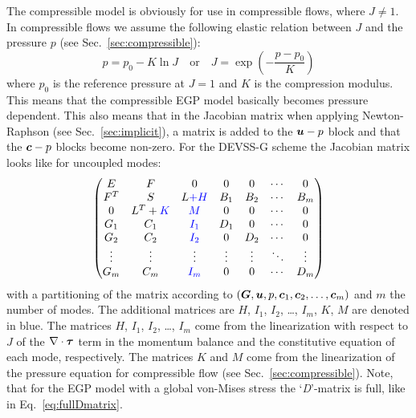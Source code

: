 The compressible model is obviously for use in compressible flows, where $J\neq 1$. In compressible flows we assume the following elastic relation between $J$ and the pressure $p$ (see Sec.~\ref{sec:compressible}):
\[
   p = p_0 - K\ln J\quad\text{or}\quad J=\exp(-\frac{p-p_0}{K}) 
\]
where $p_0$ is the reference pressure at $J=1$ and $K$ is the compression modulus. This means that the compressible EGP model basically becomes pressure dependent. This also means that in the Jacobian matrix when applying Newton-Raphson (see Sec.~\ref{sec:implicit}), a matrix is added to the $\boldsymbol{u}-p$ block and that the $\boldsymbol{c}-p$ blocks become non-zero. For the DEVSS-G scheme the Jacobian matrix looks like for uncoupled modes:
\[
   \begin{pmatrix}
     E & F & 0 & 0 & 0 & \cdots & 0 \\
     F^T & S & L\textcolor{blue}{+H} & B_1 & B_2 & \cdots & B_m \\
     0 & L^T+\textcolor{blue}{K} & \textcolor{blue}{M} & 0 & 0 & \cdots & 0 \\
     G_1 & C_1 & \textcolor{blue}{I_1} & D_1 & 0 & \cdots & 0 \\
     G_2 & C_2 & \textcolor{blue}{I_2} & 0 & D_2 & \cdots & 0 \\
      \vdots &\vdots  & \vdots & \vdots & \vdots & \ddots & \vdots \\
     G_m & C_m& \textcolor{blue}{I_m} & 0 & 0& \cdots & D_m \\
    \end{pmatrix}
\]
with a partitioning of the matrix according to $(\boldsymbol{G},\boldsymbol{u},p,\boldsymbol{c}_1,\boldsymbol{c}_2,\dots,\boldsymbol{c}_m)$ and $m$ the number of modes. The additional matrices are $H$, $I_1$, $I_2$, \ldots, $I_m$, $K$, $M$ are denoted in blue. The matrices $H$, $I_1$, $I_2$, \ldots, $I_m$ come from the linearization with respect to $J$ of the $\nabla\cdot\boldsymbol{\tau}$ term in the momentum balance and the constitutive equation of each mode, respectively. The matrices $K$ and $M$ come from the linearization of the pressure equation for compressible flow (see Sec.~\ref{sec:compressible}). Note, that for the EGP model with a global von-Mises stress the `\textit{D}'-matrix is full, like in Eq.~\eqref{eq:fullDmatrix}.

